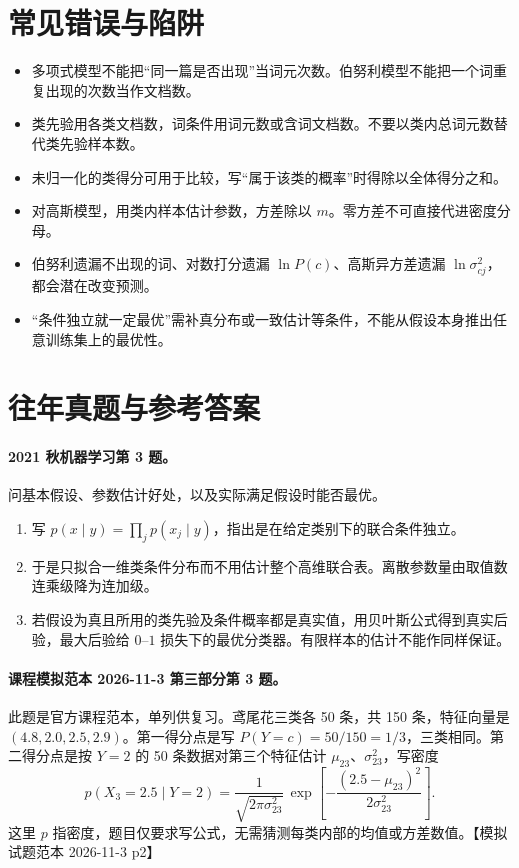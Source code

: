 \documentclass[UTF8,a4paper,zihao=-4,fontset=fandol]{ctexrep}
\begin{document}
\section{常见错误与陷阱}
\begin{itemize}
\item 多项式模型不能把“同一篇是否出现”当词元次数。伯努利模型不能把一个词重复出现的次数当作文档数。
\item 类先验用各类文档数，词条件用词元数或含词文档数。不要以类内总词元数替代类先验样本数。
\item 未归一化的类得分可用于比较，写“属于该类的概率”时得除以全体得分之和。
\item 对高斯模型，用类内样本估计参数，方差除以 $m$。零方差不可直接代进密度分母。
\item 伯努利遗漏不出现的词、对数打分遗漏 $\ln P(c)$、高斯异方差遗漏 $\ln\sigma_{cj}^2$，都会潜在改变预测。
\item “条件独立就一定最优”需补真分布或一致估计等条件，不能从假设本身推出任意训练集上的最优性。
\end{itemize}

\section{往年真题与参考答案}
\paragraph{2021 秋机器学习第 3 题。} 问基本假设、参数估计好处，以及实际满足假设时能否最优。
\begin{enumerate}
\item 写 $p(x\mid y)=\prod_jp(x_j\mid y)$，指出是在给定类别下的联合条件独立。
\item 于是只拟合一维类条件分布而不用估计整个高维联合表。离散参数量由取值数连乘级降为连加级。
\item 若假设为真且所用的类先验及条件概率都是真实值，用贝叶斯公式得到真实后验，最大后验给 $0$--$1$ 损失下的最优分类器。有限样本的估计不能作同样保证。
\end{enumerate}
\paragraph{课程模拟范本 2026-11-3 第三部分第 3 题。} 此题是官方课程范本，单列供复习。鸢尾花三类各 50 条，共 150 条，特征向量是 $(4.8,2.0,2.5,2.9)$。第一得分点是写 $P(Y=c)=50/150=1/3$，三类相同。第二得分点是按 $Y=2$ 的 50 条数据对第三个特征估计 $\mu_{23}$、$\sigma_{23}^2$，写密度
\[
 p(X_3=2.5\mid Y=2)
 =\frac{1}{\sqrt{2\pi\sigma_{23}^2}}\,
  \exp\!\left[-\frac{(2.5-\mu_{23})^2}{2\sigma_{23}^2}\right].
\]
这里 $p$ 指密度，题目仅要求写公式，无需猜测每类内部的均值或方差数值。【模拟试题范本 2026-11-3 p2】
\end{document}
